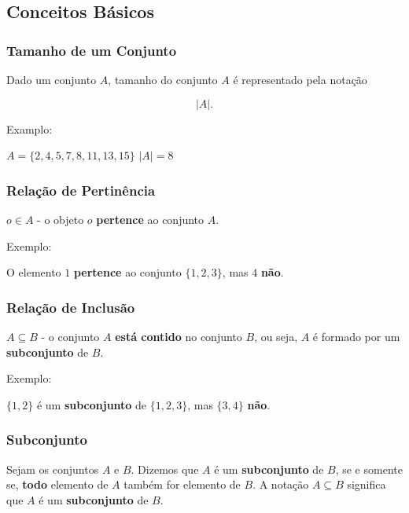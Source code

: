     \hypertarget{conceitos-buxe1sicos}{%
\subsection{Conceitos Básicos}\label{conceitos-buxe1sicos}}

    \hypertarget{tamanho-de-um-conjunto}{%
\subsubsection{Tamanho de um Conjunto}\label{tamanho-de-um-conjunto}}

Dado um conjunto \(A\), tamanho do conjunto \(A\) é representado pela
notação

\[|A|.\]

Examplo:

\(A=\{2,4,5,7,8,11,13,15\}\) \(|A|=8\)

\subsubsection{Relação de
Pertinência}\label{relauxe7uxe3o-de-pertinuxeancia}

\(o \in A\) - o objeto \(o\) \textbf{pertence} ao conjunto \(A\).

Exemplo:

O elemento \(1\) \textbf{pertence} ao conjunto \(\{1,2,3\}\), mas \(4\)
\textbf{não}.


\subsubsection{Relação de Inclusão}\label{relauxe7uxe3o-de-inclusuxe3o}

\(A\subseteq B\) - o conjunto \(A\) \textbf{está contido} no conjunto
\(B\), ou seja, \(A\) é formado por um \textbf{subconjunto} de \(B\).

Exemplo:

\(\{1,2\}\) é um \textbf{subconjunto} de \(\{1,2,3\}\), mas \(\{3,4\}\)
\textbf{não}.

\subsubsection{Subconjunto}\label{subconjunto}

Sejam os conjuntos \(A\) e \(B\). Dizemos que \(A\) é um
\textbf{subconjunto} de \(B\), se e somente se, \textbf{todo} elemento
de \(A\) também for elemento de \(B\). A notação \(A\subseteq B\)
significa que \(A\) é um \textbf{subconjunto} de \(B\).

